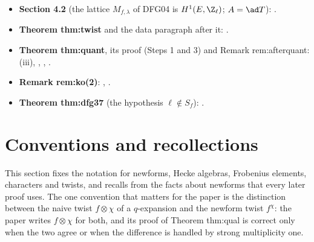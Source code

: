 \begin{itemize}
.
\item \textbf{Section 4.2} (the lattice $M_{f,\lambda}$ of DFG04 is $H^1(E,\Z_\ell)$; $A=\ad T$): .
\item \textbf{Theorem thm:twist} and the data paragraph after it: .
\item \textbf{Theorem thm:quant}, its proof (Steps 1 and 3) and Remark rem:afterquant: (iii), ,
, .
\item \textbf{Remark rem:ko(2)}: , .
\item \textbf{Theorem thm:dfg37} (the hypothesis $\ell\notin S_f$): .
\end{itemize}

\section{Conventions and recollections}\label{sec:modgalrep:conventions}

This section fixes the notation for newforms, Hecke algebras, Frobenius elements, characters and twists, and recalls from
 the facts about newforms that every later proof uses. The one convention that matters for the paper is the distinction
between the naive twist $f\otimes\chi$ of a $q$-expansion and the newform twist $f^\chi$: the paper writes $f\otimes\chi$ for both, and its proof of
Theorem thm:qual is correct only when the two agree or when the difference is handled by strong multiplicity one.

